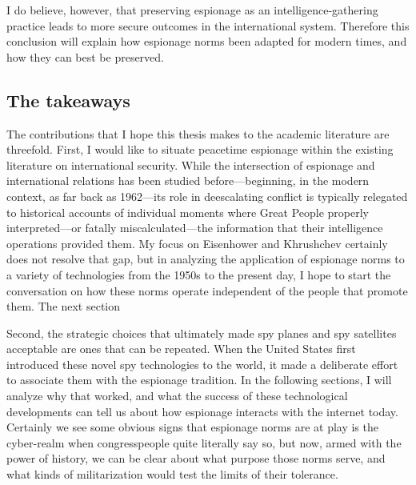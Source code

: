 \documentclass{report}
\begin{document}
I do believe, however, that preserving espionage as an intelligence-gathering practice leads to more secure outcomes in the international system. Therefore this conclusion will explain how espionage norms been adapted for modern times, and how they can best be preserved.


\subsection{The takeaways}
The contributions that I hope this thesis makes to the academic literature are threefold. First, I would like to situate peacetime espionage within the existing literature on international security. While the intersection of espionage and international relations has been studied before---beginning, in the modern context, as far back as 1962---its role in deescalating conflict is typically relegated to historical accounts of individual moments where Great People properly interpreted---or fatally miscalculated---the information that their intelligence operations provided them. My focus on Eisenhower and Khrushchev certainly does not resolve that gap, but in analyzing the application of espionage norms to a variety of technologies from the 1950s to the present day, I hope to start the conversation on how these norms operate independent of the people that promote them. The next section

Second, the strategic choices that ultimately made spy planes and spy satellites acceptable are ones that can be repeated. When the United States first introduced these novel spy technologies to the world, it made a deliberate effort to associate them with the espionage tradition. In the following sections, I will analyze why that worked, and what the success of these technological developments can tell us about how espionage interacts with the internet today. Certainly we see some obvious signs that espionage norms are at play is the cyber-realm when congresspeople quite literally say so, but now, armed with the power of history, we can be clear about what purpose those norms serve, and what kinds of militarization would test the limits of their tolerance.
\end{document}
